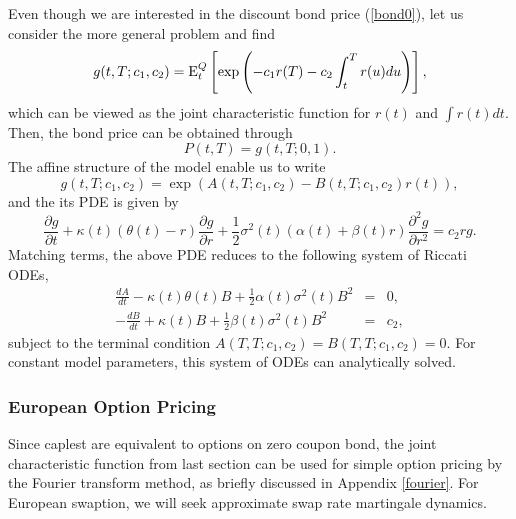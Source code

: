 \documentclass[12pt]{article}
\begin{document}
      Even though we are interested in the discount bond price (\ref{bond0}), let us consider the more general problem
      and find
      \begin{equation}
        g(t,T;c_1,c_2)={\rm E}_t^Q\left[\exp\left(-c_1r(T)-c_2\int_t^Tr(u)du\right)\right],
      \end{equation}
      which can be viewed as the joint characteristic function for $r(t)$ and $\int r(t)dt$. Then, the bond price can be
      obtained through
      \begin{equation}
        P(t,T)=g(t,T;0,1).
      \end{equation}
      The affine structure of the model enable us to write
      \begin{equation}
        g(t,T;c_1,c_2)=\exp\left(A(t,T;c_1, c_2) - B(t,T;c_1, c_2)r(t)\right),
      \end{equation}
      and the its PDE is given by
      \begin{equation}
        \frac{\partial g}{\partial t}+\kappa(t)\left(\theta(t)-r\right)\frac{\partial g}{\partial r}
            +\frac{1}{2}\sigma^2(t)(\alpha(t)+\beta(t) r)\frac{\partial^2g}{\partial r^2} = c_2rg.
      \end{equation}
      Matching terms, the above PDE reduces to the following system of Riccati ODEs,
      \begin{eqnarray}
        \frac{dA}{dt}-\kappa(t)\theta(t)B+\frac{1}{2}\alpha(t)\sigma^2(t)B^2&=&0,\\
        -\frac{dB}{dt}+\kappa(t)B+\frac{1}{2}\beta(t)\sigma^2(t)B^2&=&c_2,
      \end{eqnarray}
      subject to the terminal condition $A(T,T;c_1,c_2)=B(T,T;c_1,c_2)=0$. For constant model parameters, this system of ODEs can
      analytically solved.

    \subsubsection{European Option Pricing}

      Since caplest are equivalent to options on zero coupon bond, the joint characteristic function from last section can be used
      for simple option pricing by the Fourier transform method, as briefly discussed in Appendix \ref{fourier}. For European swaption,
      we will seek approximate swap rate martingale dynamics.
\end{document}
